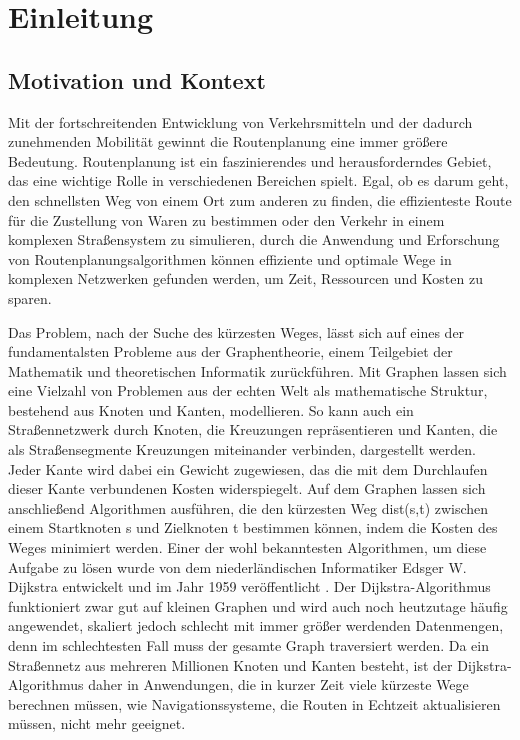 \section{Einleitung}

\subsection{Motivation und Kontext}
Mit der fortschreitenden Entwicklung von Verkehrsmitteln und der dadurch zunehmenden Mobilität
gewinnt die Routenplanung eine immer größere Bedeutung. Routenplanung ist ein faszinierendes und
herausforderndes Gebiet, das eine wichtige Rolle in verschiedenen Bereichen spielt. Egal, ob es
darum geht, den schnellsten Weg von einem Ort zum anderen zu finden, die effizienteste Route für die
Zustellung von Waren zu bestimmen oder den Verkehr in einem komplexen Straßensystem zu simulieren,
durch die Anwendung und Erforschung von Routenplanungsalgorithmen können effiziente und optimale
Wege in komplexen Netzwerken gefunden werden, um Zeit, Ressourcen und Kosten zu sparen.

Das Problem, nach der Suche des kürzesten Weges, lässt sich auf eines der fundamentalsten Probleme
aus der Graphentheorie, einem Teilgebiet der Mathematik und theoretischen Informatik 
zurückführen. Mit Graphen lassen sich eine Vielzahl von Problemen aus der echten Welt als
mathematische Struktur, bestehend aus Knoten und Kanten, modellieren. So kann auch ein
Straßennetzwerk durch Knoten, die Kreuzungen repräsentieren und Kanten, die als Straßensegmente
Kreuzungen miteinander verbinden, dargestellt werden. Jeder Kante wird dabei ein Gewicht zugewiesen,
das die mit dem Durchlaufen dieser Kante verbundenen Kosten widerspiegelt. Auf dem Graphen lassen
sich anschließend Algorithmen ausführen, die den kürzesten Weg dist(s,t) zwischen einem Startknoten
s und Zielknoten t bestimmen können, indem die Kosten des Weges minimiert werden. Einer der wohl
bekanntesten Algorithmen, um diese Aufgabe zu lösen wurde von dem niederländischen Informatiker
Edsger W. Dijkstra entwickelt und im Jahr 1959 veröffentlicht \cite{Dijkstra_1959}. Der
Dijkstra-Algorithmus funktioniert zwar gut auf kleinen Graphen und wird auch noch heutzutage häufig
angewendet, skaliert jedoch schlecht mit immer größer werdenden Datenmengen, denn im schlechtesten
Fall muss der gesamte Graph traversiert werden. Da ein Straßennetz aus mehreren Millionen Knoten und
Kanten besteht, ist der Dijkstra-Algorithmus daher in Anwendungen, die in kurzer Zeit viele kürzeste
Wege berechnen müssen, wie \zB Navigationssysteme, die Routen in Echtzeit aktualisieren müssen,
nicht mehr geeignet.

